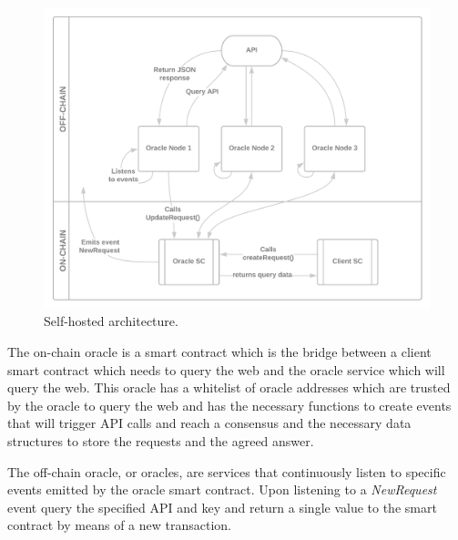 \begin{figure}[t]
    \begin{center}
        \leavevmode
        \includegraphics[width=1\textwidth]{figures/self-hosted-architecture.png}
        \caption{Self-hosted architecture.}
        \label{fig:/figures/self-hosted-architecture}
    \end{center}
\end{figure}


The on-chain oracle is a smart contract which is the bridge between a client smart contract which needs to query the web and the oracle service which will query the web. This oracle has a whitelist of oracle addresses which are trusted by the oracle to query the web and has the necessary functions to create events that will trigger API calls and reach a consensus and the necessary data structures to store the requests and the agreed answer.

The off-chain oracle, or oracles, are services that continuously listen to specific events emitted by the oracle smart contract. Upon listening to a \textit{NewRequest} event query the specified API and key and return a single value to the smart contract by means of a new transaction.

